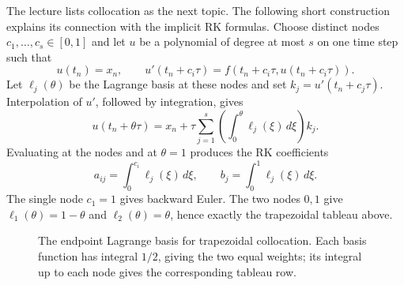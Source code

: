 The lecture lists collocation as the next topic. The following short
construction explains its connection with the implicit RK formulas.
Choose distinct nodes \(c_1,\ldots,c_s\in[0,1]\) and let \(u\) be a
polynomial of degree at most \(s\) on one time step such that
\[
 u(t_n)=x_n,\qquad
 u'(t_n+c_i\tau)=f(t_n+c_i\tau,u(t_n+c_i\tau)).
\]
Let \(\ell_j(\theta)\) be the Lagrange basis at these nodes and set
\(k_j=u'(t_n+c_j\tau)\). Interpolation of \(u'\), followed by
integration, gives
\[
 u(t_n+\theta\tau)
  =x_n+\tau\sum_{j=1}^s
       \left(\int_0^\theta\ell_j(\xi)\,d\xi\right)k_j.
\]
Evaluating at the nodes and at \(\theta=1\) produces the RK coefficients
\begin{equation}\label{eq:collocation-coefficients-sep-18}
 a_{ij}=\int_0^{c_i}\ell_j(\xi)\,d\xi,
 \qquad b_j=\int_0^1\ell_j(\xi)\,d\xi.
\end{equation}
The single node \(c_1=1\) gives backward Euler. The two nodes \(0,1\)
give \(\ell_1(\theta)=1-\theta\) and \(\ell_2(\theta)=\theta\), hence
exactly the trapezoidal tableau above.

\begin{figure}[htbp]
\centering
{}
\caption{The endpoint Lagrange basis for trapezoidal collocation.
Each basis function has integral \(1/2\), giving the two equal weights;
its integral up to each node gives the corresponding tableau row.}
\end{figure}

